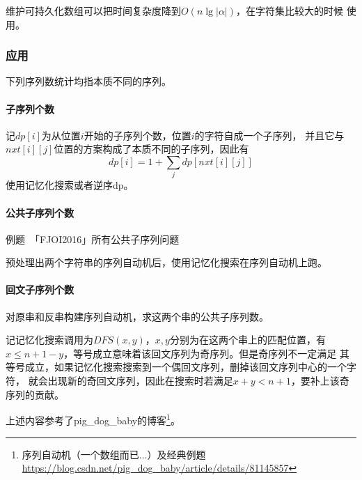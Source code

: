 维护可持久化数组可以把时间复杂度降到$O(n\lg |\alpha|)$，在字符集比较大的时候
使用。
\subsubsection{应用}
下列序列数统计均指本质不同的序列。
\paragraph{子序列个数}
记$dp[i]$为从位置$i$开始的子序列个数，位置$i$的字符自成一个子序列，
并且它与$nxt[i][j]$位置的方案构成了本质不同的子序列，因此有
\begin{displaymath}
    dp[i]=1+\sum_j{dp[nxt[i][j]]}
\end{displaymath}
使用记忆化搜索或者逆序dp。
\paragraph{公共子序列个数}
例题~「FJOI2016」所有公共子序列问题

预处理出两个字符串的序列自动机后，使用记忆化搜索在序列自动机上跑。
\paragraph{回文子序列个数}
对原串和反串构建序列自动机，求这两个串的公共子序列数。

记记忆化搜索调用为$DFS(x,y)$，$x,y$分别为在这两个串上的匹配位置，有
$x\leq n+1-y$，等号成立意味着该回文序列为奇序列。但是奇序列不一定满足
其等号成立，如果记忆化搜索搜索到一个偶回文序列，删掉该回文序列中心的一个字符，
就会出现新的奇回文序列，因此在搜索时若满足$x+y<n+1$，要补上该奇序列的贡献。

上述内容参考了pig\_dog\_baby的博客\footnote{
    序列自动机（一个数组而已...）及经典例题
    \url{https://blog.csdn.net/pig\_dog\_baby/article/details/81145857}
}。
